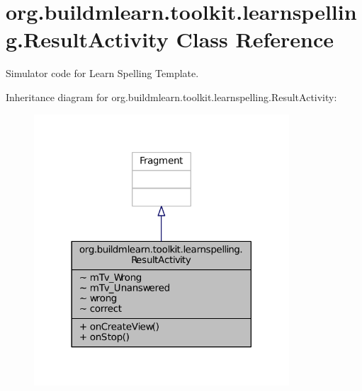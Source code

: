 \hypertarget{classorg_1_1buildmlearn_1_1toolkit_1_1learnspelling_1_1ResultActivity}{\section{org.\-buildmlearn.\-toolkit.\-learnspelling.\-Result\-Activity Class Reference}
\label{classorg_1_1buildmlearn_1_1toolkit_1_1learnspelling_1_1ResultActivity}
}


Simulator code for Learn Spelling Template.  




Inheritance diagram for org.\-buildmlearn.\-toolkit.\-learnspelling.\-Result\-Activity\-:
\nopagebreak
\begin{figure}[H]
\begin{center}
\leavevmode
\includegraphics[width=270pt]{d1/d28/classorg_1_1buildmlearn_1_1toolkit_1_1learnspelling_1_1ResultActivity__inherit__graph}
\end{center}
\end{figure}


